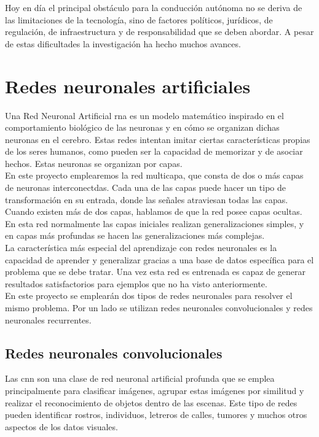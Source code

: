 Hoy en día el principal obstáculo para la conducción autónoma no se deriva de las limitaciones de la tecnología, sino de factores políticos, jurídicos, de regulación, de infraestructura y de responsabilidad que se deben abordar. A pesar de estas dificultades la investigación ha hecho muchos avances.\\


\section{Redes neuronales artificiales}

Una Red Neuronal Artificial \acrshort{rna} es un modelo matemático inspirado en el comportamiento biológico de las neuronas y en cómo se organizan dichas neuronas en el cerebro. Estas redes intentan imitar ciertas  características propias de los seres humanos, como pueden ser la capacidad de memorizar y de asociar hechos. Estas neuronas se organizan por capas.\\

En este proyecto emplearemos la red multicapa, que consta de dos o más capas de neuronas interconectdas. Cada una de las capas puede hacer un tipo de transformación en su entrada, donde las señales atraviesan todas las capas. Cuando existen más de dos capas, hablamos de que la red posee capas ocultas. En esta red normalmente las capas iniciales realizan generalizaciones simples, y en capas más profundas se hacen las generalizaciones más complejas.\\

La característica más especial del aprendizaje con redes neuronales es la capacidad de aprender y generalizar gracias a una base de datos específica para el problema que se debe tratar. Una vez esta red es entrenada es capaz de generar resultados satisfactorios para ejemplos que no ha visto anteriormente.\\

En este proyecto se emplearán dos tipos de redes neuronales para resolver el mismo problema. Por un lado se utilizan redes neuronales convolucionales y redes neuronales recurrentes.


\subsection{Redes neuronales convolucionales}

Las \acrfull{cnn} son una clase de red neuronal artificial profunda que se emplea principalmente para clasificar imágenes, agrupar estas imágenes por similitud y realizar el reconocimiento de objetos dentro de las escenas. Este tipo de redes pueden identificar rostros, individuos, letreros de calles, tumores y muchos otros aspectos de los datos visuales.\\

